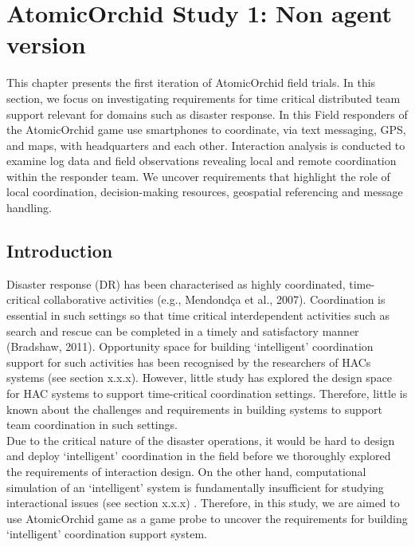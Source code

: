 \chapter{AtomicOrchid Study 1: Non agent version}\label{ch:mathtest} %
This chapter presents the first iteration of AtomicOrchid field trials. In this section, we focus on investigating requirements for time critical distributed team support relevant for domains such as disaster response. In this Field responders of the AtomicOrchid game use smartphones to coordinate, via text messaging, GPS, and maps, with headquarters and each other. Interaction analysis is conducted to examine log data and field observations revealing local and remote coordination within the responder team. We uncover requirements that highlight the role of local coordination, decision-making resources, geospatial referencing and message handling. \\


\section{Introduction}
Disaster response (DR) has been characterised as highly coordinated, time-critical collaborative activities (e.g., Mendondça et al., 2007). Coordination is essential in such settings so that time critical interdependent activities such as search and rescue can be completed in a timely and satisfactory manner (Bradshaw, 2011). Opportunity space for building `intelligent' coordination support for  such activities has been recognised by the researchers of HACs systems (see section x.x.x). However, little study has explored the  design space for HAC systems to support time-critical coordination settings. Therefore, little is known about the challenges and requirements in building systems to support team coordination in such settings.\\

Due to the critical nature of the disaster operations, it would be hard to design and deploy `intelligent' coordination in the field before we thoroughly explored the requirements of interaction design. On the other hand, computational simulation of an `intelligent' system is fundamentally insufficient for studying interactional issues (see section x.x.x) . Therefore, in this study, we are aimed to use AtomicOrchid game as a game probe to uncover the requirements for building `intelligent' coordination support system. \\

